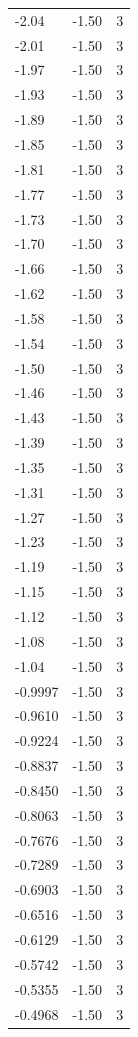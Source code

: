 \begin{longtable}{lrr}
  -2.04 & -1.50 & 3 \\
  -2.01 & -1.50 & 3 \\
  -1.97 & -1.50 & 3 \\
  -1.93 & -1.50 & 3 \\
  -1.89 & -1.50 & 3 \\
  -1.85 & -1.50 & 3 \\
  -1.81 & -1.50 & 3 \\
  -1.77 & -1.50 & 3 \\
  -1.73 & -1.50 & 3 \\
  -1.70 & -1.50 & 3 \\
  -1.66 & -1.50 & 3 \\
  -1.62 & -1.50 & 3 \\
  -1.58 & -1.50 & 3 \\
  -1.54 & -1.50 & 3 \\
  -1.50 & -1.50 & 3 \\
  -1.46 & -1.50 & 3 \\
  -1.43 & -1.50 & 3 \\
  -1.39 & -1.50 & 3 \\
  -1.35 & -1.50 & 3 \\
  -1.31 & -1.50 & 3 \\
  -1.27 & -1.50 & 3 \\
  -1.23 & -1.50 & 3 \\
  -1.19 & -1.50 & 3 \\
  -1.15 & -1.50 & 3 \\
  -1.12 & -1.50 & 3 \\
  -1.08 & -1.50 & 3 \\
  -1.04 & -1.50 & 3 \\
  -0.9997 & -1.50 & 3 \\
  -0.9610 & -1.50 & 3 \\
  -0.9224 & -1.50 & 3 \\
  -0.8837 & -1.50 & 3 \\
  -0.8450 & -1.50 & 3 \\
  -0.8063 & -1.50 & 3 \\
  -0.7676 & -1.50 & 3 \\
  -0.7289 & -1.50 & 3 \\
  -0.6903 & -1.50 & 3 \\
  -0.6516 & -1.50 & 3 \\
  -0.6129 & -1.50 & 3 \\
  -0.5742 & -1.50 & 3 \\
  -0.5355 & -1.50 & 3 \\
  -0.4968 & -1.50 & 3 \\

\end{longtable}
